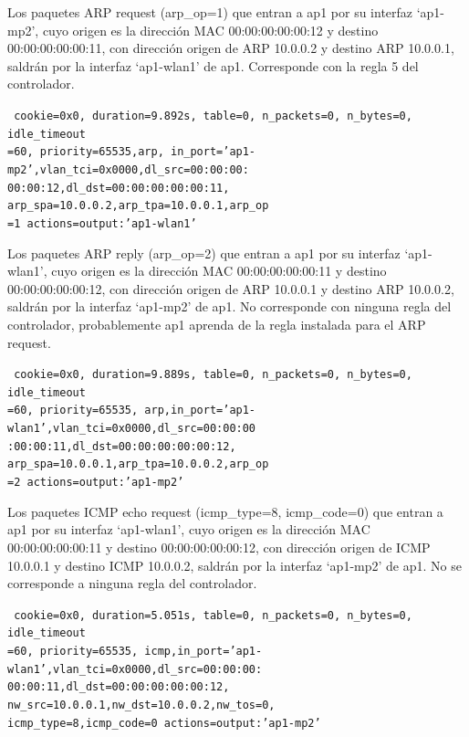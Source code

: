\documentclass[a4paper,12pt,twoside,spanish]{book}
\begin{document}
Los paquetes ARP request (arp\_op=1) que entran a ap1 por su interfaz ‘ap1-mp2’, cuyo origen es la dirección MAC 00:00:00:00:00:12 y destino 00:00:00:00:00:11, con dirección origen de ARP 10.0.0.2 y destino ARP 10.0.0.1, saldrán por la interfaz ‘ap1-wlan1’ de ap1. Corresponde con la regla 5 del controlador.\par 

\noindent\texttt{
	cookie=0x0, duration=9.892s, table=0, n\_packets=0, n\_bytes=0, idle\_timeout\\
	=60, priority=65535,arp,
	in\_port='ap1-mp2',vlan\_tci=0x0000,dl\_src=00:00:00:\\
	00:00:12,dl\_dst=00:00:00:00:00:11,
	arp\_spa=10.0.0.2,arp\_tpa=10.0.0.1,arp\_op\\
	=1 actions=output:'ap1-wlan1'
}

Los paquetes ARP reply (arp\_op=2) que entran a ap1 por su interfaz ‘ap1-wlan1’, cuyo origen es la dirección MAC 00:00:00:00:00:11 y destino 00:00:00:00:00:12, con dirección origen de ARP 10.0.0.1 y destino ARP 10.0.0.2, saldrán por la interfaz ‘ap1-mp2’ de ap1. No corresponde con ninguna regla del controlador, probablemente ap1 aprenda de la regla instalada para el ARP request.\par 

\noindent\texttt{
	cookie=0x0, duration=9.889s, table=0, n\_packets=0, n\_bytes=0, idle\_timeout\\
	=60, priority=65535,
	arp,in\_port='ap1-wlan1',vlan\_tci=0x0000,dl\_src=00:00:00\\
	:00:00:11,dl\_dst=00:00:00:00:00:12,
	arp\_spa=10.0.0.1,arp\_tpa=10.0.0.2,arp\_op\\
	=2 actions=output:'ap1-mp2'
}

Los paquetes ICMP echo request (icmp\_type=8, icmp\_code=0) que entran a ap1 por su interfaz ‘ap1-wlan1’, cuyo origen es la dirección MAC 00:00:00:00:00:11 y destino 00:00:00:00:00:12, con dirección origen de ICMP 10.0.0.1 y destino ICMP 10.0.0.2, saldrán por la interfaz ‘ap1-mp2’ de ap1. No se corresponde a ninguna regla del controlador.\par 

\noindent\texttt{
	cookie=0x0, duration=5.051s, table=0, n\_packets=0, n\_bytes=0, idle\_timeout\\
	=60, priority=65535,
	icmp,in\_port='ap1-wlan1',vlan\_tci=0x0000,dl\_src=00:00:00:\\
	00:00:11,dl\_dst=00:00:00:00:00:12,
	nw\_src=10.0.0.1,nw\_dst=10.0.0.2,nw\_tos=0,\\
	icmp\_type=8,icmp\_code=0 actions=output:'ap1-mp2'
}
\end{document}
